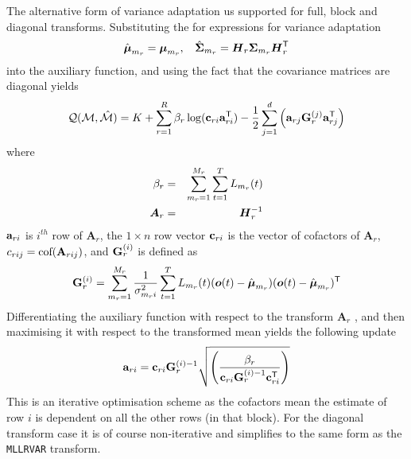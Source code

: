 The alternative form of variance adaptation us supported for full,
block and diagonal transforms. Substituting the for expressions for
variance adaptation
\begin{eqnarray}
\hat{{\mbox{\boldmath $\mu$}}}_{m_r} = {\mbox{\boldmath $\mu$}}_{m_r}, \:\:\:\: 
\hat{{\mbox{\boldmath $\Sigma$}}}_{m_r} = {{\mbox{\boldmath $H$}}}_r{{\mbox{\boldmath $\Sigma$}}}_{m_r}{{\mbox{\boldmath $H$}}}_r^{\scriptstyle\sf T}
\end{eqnarray}
into the auxiliary function, and using the fact that the covariance
matrices are diagonal yields
\begin{eqnarray}
{\cal Q}({\cal M},{\hat{\cal M}}) = K + 
\sum_{r=1}^R
\beta_r\log({\bf c}_{ri}{\bf a}_{ri}^{\scriptstyle\sf T})-
\frac{1}{2}
\sum_{j=1}^d{
\left({\bf a}_{rj}{\bf G}^{(j)}_r{\bf a}^{\scriptstyle\sf T}_{rj}
\right)} \nonumber
\end{eqnarray}
where 
\begin{eqnarray}
\beta_r &=& \sum_{m_r=1}^{M_r}\sum_{t=1}^TL_{m_r}(t)\\
{{\mbox{\boldmath $A$}}}_r &=& {{\mbox{\boldmath $H$}}}_r^{-1}
\end{eqnarray}
${\bf a}_{ri}$ is $i^{th}$ row of ${\bm
A}_r$, the $1\times n$ row vector ${\bf c}_{ri}$ is the vector of
cofactors of ${\bm A}_r$, $c_{rij}={\mbox{cof}}({\bf A}_{rij})$,
and  ${\bf G}^{(i)}_r$ is defined as
\begin{eqnarray}
{\bf G}^{(i)}_r=\sum_{m_r=1}^{M_r}
\frac{1}{\sigma_{m_ri}^{2}}
\sum_{t=1}^TL_{m_r}(t)({\mbox{\boldmath $o$}}(t)-\hat{{\mbox{\boldmath $\mu$}}}_{m_r})
({\mbox{\boldmath $o$}}(t)-\hat{{\mbox{\boldmath $\mu$}}}_{m_r})^{\scriptstyle\sf T}
\label{eq:gi_mllr2}
\end{eqnarray}
Differentiating the auxiliary function with respect to the transform
${\bm A}_r$ , and then maximising it with respect to the transformed mean
yields the following update
\begin{eqnarray}
{\bf a}_{ri} ={\bf c}_{ri}{\bf G}^{(i)-1}_r
\sqrt{\left(\frac{\beta_r}{{\bf
c}_{ri}{\bf G}_r^{(i)-1}{\bf c}^{\scriptstyle\sf T}_{ri}}\right)}
\end{eqnarray}
This is an iterative optimisation scheme as the cofactors mean the estimate
of row $i$ is dependent on all the other rows (in that block). For the 
diagonal transform case it is of course non-iterative and simplifies to
the same form as the {\tt MLLRVAR} transform.


